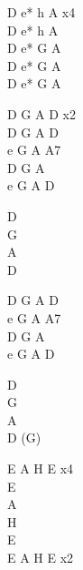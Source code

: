 \begin{chord}
\OneColVin D e* h A x4\\
D e* h A\\
D e* G A\\
D e* G A\\
D e* G A

\OneColVin D G A D x2\\
D G A D\\
e G A A7\\
D G A\\
e G A D

\hfill\break
\OneColVin D\\
\OneColVin G\\
\OneColVin A\\
\OneColVin D

D G A D\\
e G A A7\\
D G A\\
e G A D

\hfill\break
\OneColVin D\\
\OneColVin G\\
\OneColVin A\\
\OneColVin D (G)

E A H E x4\\
\OneColVin E\\
\OneColVin A\\
\OneColVin H\\
\OneColVin E\\
E A H E x2
\end{chord}
